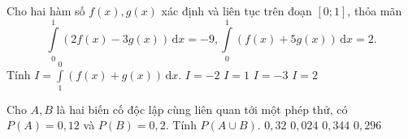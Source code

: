 \begin{ex}%
Cho hai hàm số $f(x), g(x)$ xác định và liên tục trên đoạn $[0;1]$, thỏa mãn $$\displaystyle\int\limits_0^1\left(2f(x)-3g(x)\right)\mathrm{\,d}x=-9, \displaystyle\int\limits_0^1\left(f(x)+5g(x)\right)\mathrm{\,d}x=2.$$
Tính $I=\displaystyle\int\limits_1^0\left(f(x)+g(x)\right)\mathrm{\,d}x$.
\choice
{$I=-2$}
{$I=1$}
{$I=-3$}
{\True $I=2$}
\end{ex}

\begin{ex}%
Cho $A, B$ là hai biến cố độc lập cùng liên quan tới một phép thử, có $P(A)=0{,}12$ và $P(B)=0{,}2$. Tính $P(A\cup B)$.
\choice
{$0{,}32$}
{$0{,}024$}
{$0{,}344$}
{\True $0{,}296$}
\end{ex}

